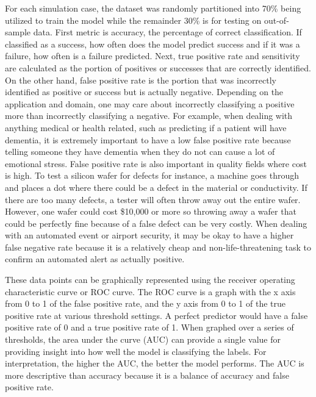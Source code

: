 \documentclass{llncs}
\begin{document}
For each simulation case, the dataset was randomly partitioned into 70\% being utilized to train the model while the remainder 30\% is for testing on out-of-sample data. First metric is accuracy, the percentage of correct classification. If classified as a success, how often does the model predict success and if it was a failure, how often is a failure predicted. Next, true positive rate and sensitivity are calculated as the portion of positives or successes that are correctly identified. On the other hand, false positive rate is the portion that was incorrectly identified as positive or success but is actually negative.  Depending on the application and domain, one may care about incorrectly classifying a positive more than incorrectly classifying a negative.  For example, when dealing with anything medical or health related, such as predicting if a patient will have dementia, it is extremely important to have a low false positive rate because telling someone they have dementia when they do not can cause a lot of emotional stress.  False positive rate is also important in quality fields where cost is high.  To test a silicon wafer for defects for instance, a machine goes through and places a dot where there could be a defect in the material or conductivity.  If there are too many defects, a tester will often throw away out the entire wafer.  However, one wafer could cost \$10,000 or more so throwing away a wafer that could be perfectly fine because of a false defect can be very costly.  When dealing with an automated event or airport security, it may be okay to have a higher false negative rate because it is a relatively cheap and non-life-threatening task to confirm an automated alert as actually positive.

These data points can be graphically represented using the receiver operating characteristic curve or ROC curve.  The ROC curve is a graph with the x axis from 0 to 1 of the false positive rate, and the y axis from 0 to 1 of the true positive rate at various threshold settings.  A perfect predictor would have a false positive rate of 0 and a true positive rate of 1.  When graphed over a series of thresholds, the area under the curve (AUC) can provide a single value for providing insight into how well the model is classifying the labels. For interpretation, the higher the AUC, the better the model performs. The AUC is more descriptive than accuracy because it is a balance of accuracy and false positive rate.
\end{document}
